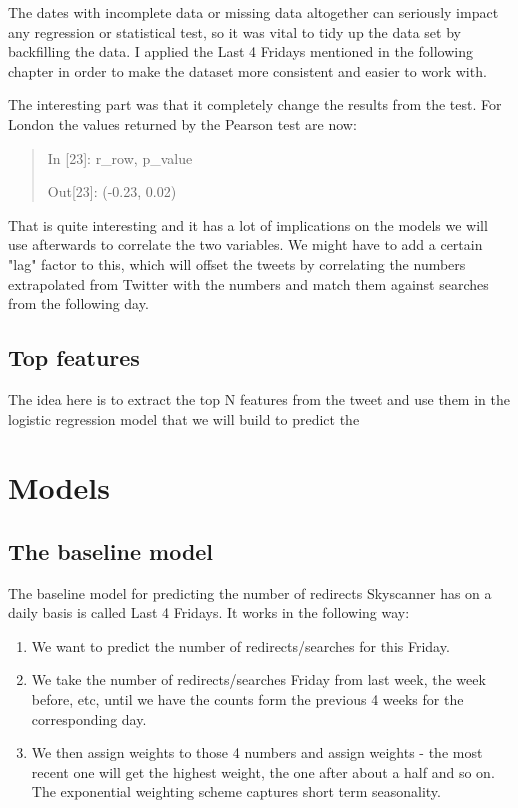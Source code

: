 \documentclass[minf,frontabs,twoside,singlespacing,parskip]{infthesis}
\begin{document}
The dates with incomplete data or missing data altogether can seriously impact any regression or statistical test, so it was vital to tidy up the data set by backfilling the data. I applied the Last 4 Fridays mentioned in the following chapter in order to make the dataset more consistent and easier to work with. 

The interesting part was that it completely change the results from the test. For London the values returned by the Pearson test are now:

\begin{quotation}
In [23]: r\_row, p\_value

Out[23]: (-0.23, 0.02)
\end{quotation}

That is quite interesting and it has a lot of implications on the models we will use afterwards to correlate the two variables. 
We might have to add a certain "lag" factor to this, which will offset the tweets by correlating the numbers extrapolated from Twitter with the numbers and match them against searches from the following day.

\section{Top features} 

The idea here is to extract the top N features from the tweet and use them in the logistic regression model that we will build to predict the 



\chapter{Models}

\section{The baseline model}

The baseline model for predicting the number of redirects Skyscanner has on a daily basis is called Last 4 Fridays. 
It works in the following way:
\begin{enumerate}
\item We want to predict the number of redirects/searches for this Friday.
\item We take the number of redirects/searches Friday from last week, the week before, etc, until we have the counts form the previous 4 weeks for the corresponding day.
\item We then assign weights to those 4 numbers and assign weights - the most recent one will get the highest weight, the one after about a half and so on. The exponential weighting scheme captures short term seasonality.
\end{enumerate}
\end{document}
